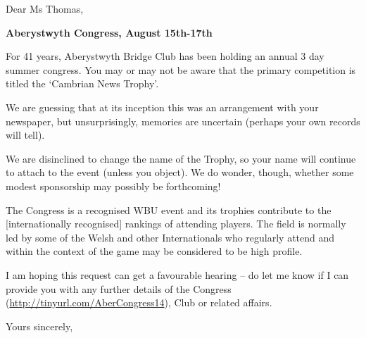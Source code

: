 \documentclass[12pt]{letter}
\begin{document}
\begin{letter}{}
\opening{Dear Ms Thomas,}

{\bf Aberystwyth Congress, August 15th-17th}

For 41 years, Aberystwyth Bridge Club has been holding an annual 3 day
summer congress.  You may or may not be aware that the primary competition is
titled the `Cambrian News Trophy'.

We are guessing that at its inception this was an arrangement with your
newspaper, but unsurprisingly, memories are uncertain (perhaps your
own records will tell).

We are disinclined to change the name of the Trophy, so your name will
continue to attach to the event (unless you object).  We do wonder,
though, whether some modest sponsorship may possibly be forthcoming!

The Congress is a recognised WBU event and its trophies contribute to
the [internationally recognised]
rankings of attending players.  The field is normally led by some
of the Welsh and other Internationals who regularly attend and within
the context of the game may be considered to be high profile.

I am hoping this request can get a favourable hearing -- do let me
know if I can provide you with any further details of the Congress
(\url{http://tinyurl.com/AberCongress14}),
Club or related affairs.

\closing{Yours sincerely,}


\end{letter}
\end{document}
